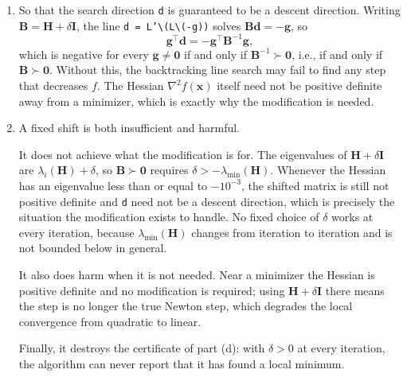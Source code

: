 \begin{solution}
    
    \begin{enumerate}[label=(\alph*)]
        \item So that the search direction \texttt{d} is guaranteed to be a descent direction. Writing $\mathbf{B} = \mathbf{H} + \delta\mathbf{I}$, the line \texttt{d = L'\textbackslash(L\textbackslash(-g))} solves $\mathbf{B}\mathbf{d} = -\mathbf{g}$, so
        \[
            \mathbf{g}^\top \mathbf{d} = -\mathbf{g}^\top \mathbf{B}^{-1} \mathbf{g},
        \]
        which is negative for every $\mathbf{g} \neq \mathbf{0}$ if and only if $\mathbf{B}^{-1} \succ \mathbf{0}$, i.e., if and only if $\mathbf{B} \succ \mathbf{0}$. Without this, the backtracking line search may fail to find any step that decreases $f$. The Hessian $\nabla^2 f(\mathbf{x})$ itself need not be positive definite away from a minimizer, which is exactly why the modification is needed.
        \item A fixed shift is both insufficient and harmful.

        It does not achieve what the modification is for. The eigenvalues of $\mathbf{H} + \delta\mathbf{I}$ are $\lambda_i(\mathbf{H}) + \delta$, so $\mathbf{B} \succ \mathbf{0}$ requires $\delta > -\lambda_{\min}(\mathbf{H})$. Whenever the Hessian has an eigenvalue less than or equal to $-10^{-3}$, the shifted matrix is still not positive definite and \texttt{d} need not be a descent direction, which is precisely the situation the modification exists to handle. No fixed choice of $\delta$ works at every iteration, because $\lambda_{\min}(\mathbf{H})$ changes from iteration to iteration and is not bounded below in general.

        It also does harm when it is not needed. Near a minimizer the Hessian is positive definite and no modification is required; using $\mathbf{H} + \delta\mathbf{I}$ there means the step is no longer the true Newton step, which degrades the local convergence from quadratic to linear.

        Finally, it destroys the certificate of part (d): with $\delta > 0$ at every iteration, the algorithm can never report that it has found a local minimum.


\end{enumerate}
\end{solution}
